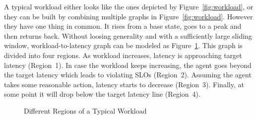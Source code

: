 A typical workload either looks like the ones depicted by Figure~\ref{fig:workload}, or they can be built by combining multiple graphs in Figure~\ref{fig:workload}. However they have one thing in common. It rises from a base state, goes to a peak and then returns back. Without loosing generality and with a sufficiently large sliding window, workload-to-latency graph can be modeled as Figure~\ref{des:f:ss-region}. This graph is divided into four regions. As workload increases, latency is approaching target latency (Region~1). In case the workload keeps increasing, the agent goes beyond the target latency which leads to violating SLOs (Region~2). Assuming the agent takes some reasonable action, latency starts to decrease (Region~3). Finally, at some point it will drop below the target latency line (Region~4).
\begin{figure}[th]
    \centering
    \caption{Different Regions of a Typical Workload}
    \label{des:f:ss-region}
\end{figure}

